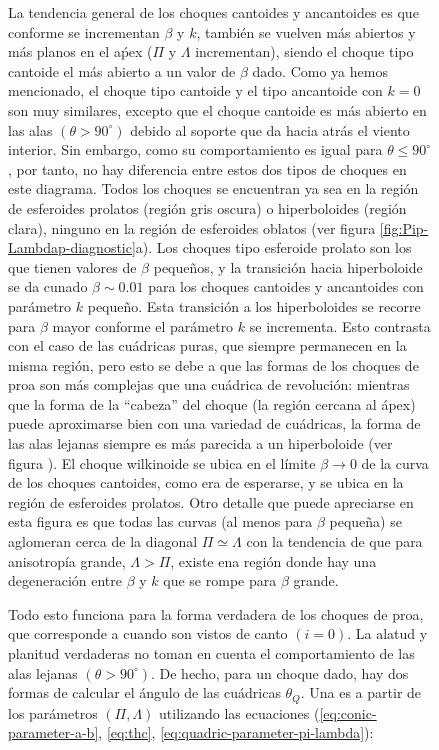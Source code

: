 \begin{figure}
La tendencia general de los choques cantoides y ancantoides es que conforme se incrementan $\beta$ y $k$, también se vuelven más abiertos y más planos en el aṕex ($\Pi$ y $\Lambda$ incrementan), siendo el choque tipo cantoide el más abierto a un valor de $\beta$ dado. Como ya hemos mencionado, el choque tipo cantoide y el tipo ancantoide con $k=0$ son muy similares, excepto que el choque cantoide es más abierto en las alas $(\theta > 90^\circ)$ debido al soporte que da hacia atrás el viento interior. Sin embargo, como su comportamiento es igual para $\theta \leq 90^\circ$, por tanto, no hay diferencia entre estos dos tipos de choques en este diagrama. Todos los choques se encuentran ya sea en la región de esferoides prolatos (región gris oscura) o hiperboloides (región clara), ninguno en la región de esferoides oblatos (ver figura \ref{fig:Pip-Lambdap-diagnostic}a). Los choques tipo esferoide prolato son los que tienen valores de $\beta$ pequeños, y la transición hacia hiperboloide se da cunado $\beta \sim 0.01$ para los choques cantoides y ancantoides con parámetro $k$ pequeño. Esta transición a los hiperboloides se recorre para $\beta$ mayor conforme el parámetro $k$ se incrementa. Esto contrasta con el caso de las cuádricas puras, que siempre permanecen en la misma región, pero esto se debe a que las formas de los choques de proa son más complejas que una cuádrica de revolución: mientras que la forma de la ``cabeza'' del choque (la región cercana al ápex) puede aproximarse bien con una variedad de cuádricas, la forma de las alas lejanas siempre es más parecida a un hiperboloide (ver figura ). El choque wilkinoide se ubica en el límite $\beta\to 0$ de la curva de los choques cantoides, como era de esperarse, y se ubica en la región de esferoides prolatos. Otro detalle que puede apreciarse en esta figura es que todas las curvas (al menos para $\beta$ pequeña) se aglomeran cerca de la diagonal $\Pi \simeq \Lambda$ con la tendencia de que para anisotropía grande, $\Lambda > \Pi$, existe ena región donde hay una degeneración entre $\beta$ y $k$ que se rompe para $\beta$ grande.

Todo esto funciona para la forma verdadera de los choques de proa, que corresponde a cuando son vistos de canto $(i=0)$. La alatud y planitud verdaderas no toman en cuenta el comportamiento de las alas lejanas $(\theta > 90^\circ)$. De hecho, para un choque dado, hay dos formas de calcular el ángulo de las cuádricas $\theta_Q$. Una es a partir de los parámetros $(\Pi, \Lambda)$ utilizando las ecuaciones (\ref{eq:conic-parameter-a-b}, \ref{eq:thc}, \ref{eq:quadric-parameter-pi-lambda}):


\end{figure}
